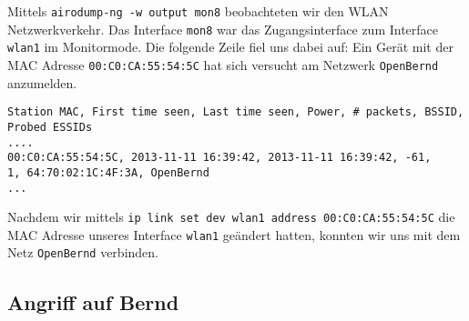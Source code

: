 \documentclass[10pt,a4paper]{article}
\begin{document}
Mittels \texttt{airodump-ng -w output mon8} beobachteten wir den WLAN Netzwerkverkehr. Das Interface \texttt{mon8} war das Zugangsinterface zum Interface \texttt{wlan1} im Monitormode. Die folgende Zeile fiel uns dabei auf: Ein Gerät mit der MAC Adresse \texttt{00:C0:CA:55:54:5C} hat sich versucht am Netzwerk \texttt{OpenBernd} anzumelden.
\begin{small}
\begin{verbatim}
Station MAC, First time seen, Last time seen, Power, # packets, BSSID, Probed ESSIDs
....
00:C0:CA:55:54:5C, 2013-11-11 16:39:42, 2013-11-11 16:39:42, -61,        1, 64:70:02:1C:4F:3A, OpenBernd
...
\end{verbatim}
\end{small}
Nachdem wir mittels \texttt{ip link set dev wlan1 address 00:C0:CA:55:54:5C} die MAC Adresse unseres Interface \texttt{wlan1} geändert hatten, konnten wir uns mit dem Netz \texttt{OpenBernd} verbinden.

\subsection{Angriff auf Bernd}
\end{document}
